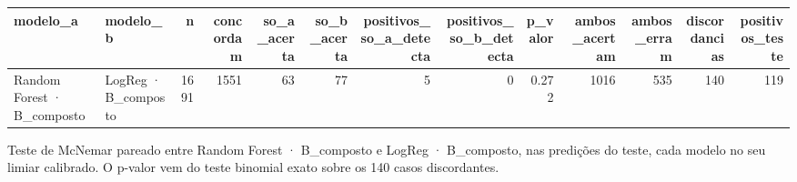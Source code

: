 \begin{tabular}{llrrrrrrrrrrr}
\toprule
modelo_a & modelo_b & n & concordam & so_a_acerta & so_b_acerta & positivos_so_a_detecta & positivos_so_b_detecta & p_valor & ambos_acertam & ambos_erram & discordancias & positivos_teste \\
\midrule
Random Forest · B_composto & LogReg · B_composto & 1691 & 1551 & 63 & 77 & 5 & 0 & 0.272 & 1016 & 535 & 140 & 119 \\
\bottomrule
\end{tabular}

\begin{flushleft}
\footnotesize Teste de McNemar pareado entre Random Forest · B_composto e LogReg · B_composto, nas predições do teste, cada modelo no seu limiar calibrado. O p-valor vem do teste binomial exato sobre os 140 casos discordantes.
\end{flushleft}
